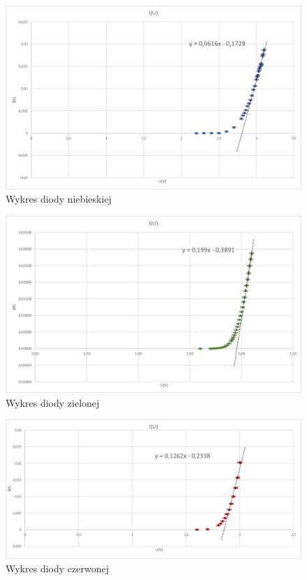 \documentclass{article}
\begin{document}
\newpage
\begin{figure}[h]
    \centering
    \includegraphics[scale=1.2]{Wykres_Dioda_Niebieska.png}
    \caption{Wykres diody niebieskiej}
\end{figure}



\begin{figure}[h!]
    \centering
    \includegraphics[scale=1.2]{Wykres_Dioda_Zielona.png}
    \caption{Wykres diody zielonej}
\end{figure}
\newpage
\begin{figure}[th!]
    \centering
    \includegraphics[scale=1.2]{Wykres_Dioda_Czerwona.png}
    \caption{Wykres diody czerwonej}
\end{figure}
\end{document}
